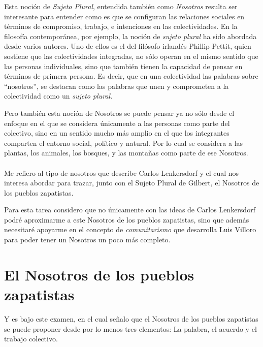 \documentclass[oneside]{book}
\begin{document}
Esta noción de \textit{Sujeto Plural}, entendida también como \textit{Nosotros} resulta ser interesante para entender como es que se configuran las relaciones sociales en términos de compromiso, trabajo, e intenciones en las colectividades. En la filosofía contemporánea, por ejemplo, la noción de \textit{sujeto plural} ha sido abordada desde varios autores. Uno de ellos es el del filósofo irlandés Phillip Pettit\cite{pettit}, quien sostiene que las colectividades integradas, no sólo operan en el mismo sentido que las personas individuales, sino que también tienen la capacidad de pensar en términos de primera persona. Es decir, que en una colectividad las palabras sobre “nosotros”, se destacan como las palabras que unen y comprometen a la colectividad como un \textit{sujeto plural}.

Pero también esta noción de Nosotros se puede pensar ya no sólo desde el enfoque en el que se considera únicamente a las personas como parte del colectivo, sino en un sentido mucho más amplio en el que los integrantes comparten el entorno social, político y natural. Por lo cual se considera a las plantas, los animales, los bosques, y las montañas como parte de ese Nosotros. 
\\
\\

Me refiero al tipo de nosotros que describe Carlos Lenkersdorf y el cual nos interesa abordar para trazar, junto con el Sujeto Plural de Gilbert, el Nosotros de los pueblos zapatistas.

Para esta tarea considero que no únicamente con las ideas de Carlos Lenkersdorf podré aproximarme a este Nosotros de los pueblos zapatistas, sino que además necesitaré apoyarme en el concepto de \textit{comunitarismo} que desarrolla Luis Villoro para poder tener un Nosotros un poco más completo.

\chapter{El Nosotros de los pueblos zapatistas}

Y es bajo este examen, en el cual señalo que el Nosotros de los pueblos zapatistas se puede proponer desde por lo menos tres elementos: La palabra, el acuerdo y el trabajo colectivo.
\\
\end{document}
